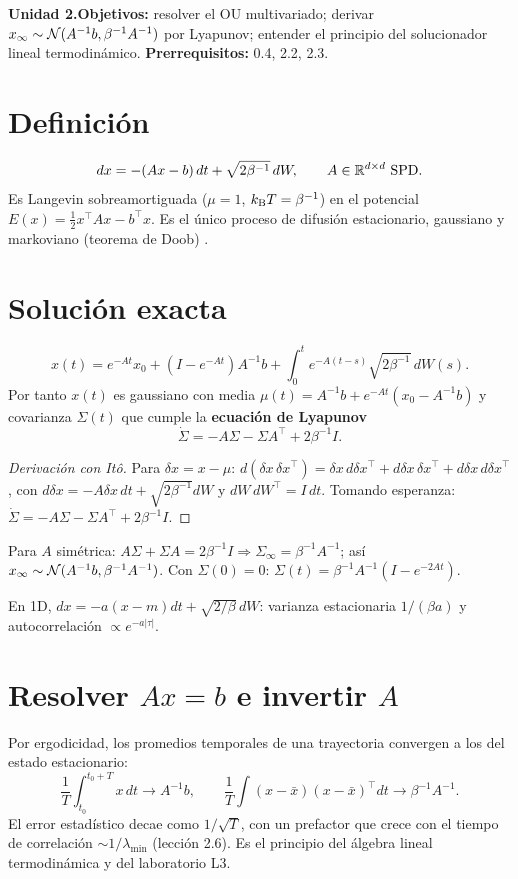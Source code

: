 \documentclass[11pt,a4paper]{article}
\begin{document}

\noindent\textbf{Unidad 2.}\quad\textbf{Objetivos:} resolver el OU multivariado; derivar $x_\infty\sim\mathcal{N}(A^{-1}b,\beta^{-1}A^{-1})$ por
Lyapunov; entender el principio del solucionador lineal termodinámico. \textbf{Prerrequisitos:} 0.4, 2.2, 2.3.

\section{Definición}
\begin{equation}dx=-(Ax-b)\,dt+\sqrt{2\beta^{-1}}\,dW,\qquad A\in\mathbb{R}^{d\times d}\ \text{SPD}.\end{equation}
Es Langevin sobreamortiguada ($\mu=1$, $k_{\mathrm B} T=\beta^{-1}$) en el potencial $E(x)=\frac12x^\top Ax-b^\top x$. Es el único
proceso de difusión estacionario, gaussiano y markoviano (teorema de Doob) \cite{gardiner}.

\section{Solución exacta}
\begin{equation}x(t)=e^{-At}x_0+(I-e^{-At})A^{-1}b+\int_0^te^{-A(t-s)}\sqrt{2\beta^{-1}}\,dW(s).\end{equation}
Por tanto $x(t)$ es gaussiano con media $\mu(t)=A^{-1}b+e^{-At}(x_0-A^{-1}b)$ y covarianza $\Sigma(t)$ que cumple la
\textbf{ecuación de Lyapunov}
\begin{equation}\dot\Sigma=-A\Sigma-\Sigma A^\top+2\beta^{-1}I .\end{equation}
\begin{proof}[Derivación con Itô]
Para $\delta x=x-\mu$: $d(\delta x\,\delta x^\top)=\delta x\,d\delta x^\top+d\delta x\,\delta x^\top+d\delta x\,d\delta x^\top$, con
$d\delta x=-A\delta x\,dt+\sqrt{2\beta^{-1}}dW$ y $dW\,dW^\top=I\,dt$. Tomando esperanza: $\dot\Sigma=-A\Sigma-\Sigma A^\top+2\beta^{-1}I$.
\end{proof}
\begin{resultado}
Para $A$ simétrica: $A\Sigma+\Sigma A=2\beta^{-1}I\Rightarrow\Sigma_\infty=\beta^{-1}A^{-1}$; así $x_\infty\sim\mathcal{N}(A^{-1}b,\beta^{-1}A^{-1})$.
Con $\Sigma(0)=0$: $\Sigma(t)=\beta^{-1}A^{-1}(I-e^{-2At})$.
\end{resultado}
En 1D, $dx=-a(x-m)dt+\sqrt{2/\beta}\,dW$: varianza estacionaria $1/(\beta a)$ y autocorrelación $\propto e^{-a|\tau|}$.

\section{Resolver $Ax=b$ e invertir $A$}
Por ergodicidad, los promedios temporales de una trayectoria convergen a los del estado estacionario:
\[\frac1T\int_{t_0}^{t_0+T}x\,dt\to A^{-1}b,\qquad\frac1T\int(x-\bar x)(x-\bar x)^\top dt\to\beta^{-1}A^{-1}.\]
El error estadístico decae como $1/\sqrt T$, con un prefactor que crece con el tiempo de correlación $\sim1/\lambda_{\min}$
(lección 2.6). Es el principio del álgebra lineal termodinámica \cite{tla} y del laboratorio L3.
\end{document}
